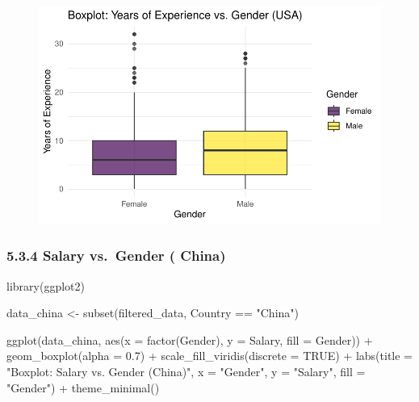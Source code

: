 \documentclass[
  letterpaper,
  DIV=11,
  numbers=noendperiod]{scrartcl}
\newenvironment{Shaded}{\begin{snugshade}}{\end{snugshade}}
\newcommand{\AttributeTok}[1]{\textcolor[rgb]{0.40,0.45,0.13}{#1}}
\newcommand{\ConstantTok}[1]{\textcolor[rgb]{0.56,0.35,0.01}{#1}}
\newcommand{\FloatTok}[1]{\textcolor[rgb]{0.68,0.00,0.00}{#1}}
\newcommand{\FunctionTok}[1]{\textcolor[rgb]{0.28,0.35,0.67}{#1}}
\newcommand{\NormalTok}[1]{\textcolor[rgb]{0.00,0.23,0.31}{#1}}
\newcommand{\OtherTok}[1]{\textcolor[rgb]{0.00,0.23,0.31}{#1}}
\newcommand{\SpecialCharTok}[1]{\textcolor[rgb]{0.37,0.37,0.37}{#1}}
\newcommand{\StringTok}[1]{\textcolor[rgb]{0.13,0.47,0.30}{#1}}
\begin{document}
\begin{figure}[H]

{\centering \includegraphics{main_doc_files/figure-pdf/unnamed-chunk-55-1.pdf}

}

\end{figure}

\hypertarget{salary-vs.-gender-china}{%
\subsubsection{5.3.4 Salary vs.~Gender (
China)}\label{salary-vs.-gender-china}}

\begin{Shaded}
\begin{Highlighting}[]
\FunctionTok{library}\NormalTok{(ggplot2)}

\NormalTok{data\_china }\OtherTok{\textless{}{-}} \FunctionTok{subset}\NormalTok{(filtered\_data, Country }\SpecialCharTok{==} \StringTok{"China"}\NormalTok{)}

\FunctionTok{ggplot}\NormalTok{(data\_china, }\FunctionTok{aes}\NormalTok{(}\AttributeTok{x =} \FunctionTok{factor}\NormalTok{(Gender), }\AttributeTok{y =}\NormalTok{ Salary, }\AttributeTok{fill =}\NormalTok{ Gender)) }\SpecialCharTok{+}
  \FunctionTok{geom\_boxplot}\NormalTok{(}\AttributeTok{alpha =} \FloatTok{0.7}\NormalTok{) }\SpecialCharTok{+}
  \FunctionTok{scale\_fill\_viridis}\NormalTok{(}\AttributeTok{discrete =} \ConstantTok{TRUE}\NormalTok{) }\SpecialCharTok{+}
  \FunctionTok{labs}\NormalTok{(}\AttributeTok{title =} \StringTok{"Boxplot: Salary vs. Gender (China)"}\NormalTok{,}
       \AttributeTok{x =} \StringTok{"Gender"}\NormalTok{,}
       \AttributeTok{y =} \StringTok{"Salary"}\NormalTok{,}
       \AttributeTok{fill =} \StringTok{"Gender"}\NormalTok{) }\SpecialCharTok{+}
  \FunctionTok{theme\_minimal}\NormalTok{()}
\end{Highlighting}
\end{Shaded}
\end{document}
